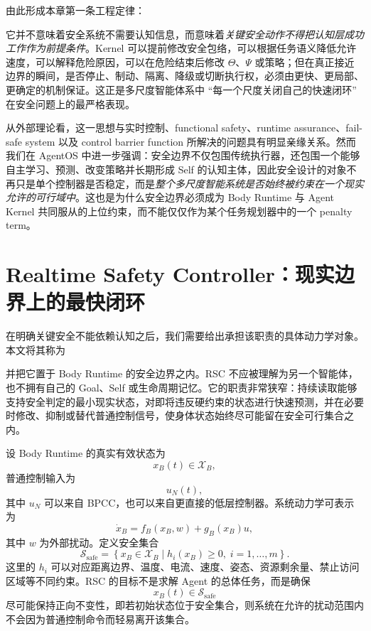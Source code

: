 由此形成本章第一条工程定律：
\begin{statementbox}
\centering
{}
\end{statementbox}
它并不意味着安全系统不需要认知信息，而意味着\emph{关键安全动作不得把认知层成功工作作为前提条件}。Kernel 可以提前修改安全包络，可以根据任务语义降低允许速度，可以解释危险原因，可以在危险结束后修改 $\Theta$、$\Psi$ 或策略；但在真正接近边界的瞬间，是否停止、制动、隔离、降级或切断执行权，必须由更快、更局部、更确定的机制保证。这正是多尺度智能体系中 ``每一个尺度关闭自己的快速闭环'' 在安全问题上的最严格表现。

从外部理论看，这一思想与实时控制、functional safety、runtime assurance、fail-safe system 以及 control barrier function 所解决的问题具有明显亲缘关系。然而我们在 AgentOS 中进一步强调：安全边界不仅包围传统执行器，还包围一个能够自主学习、预测、改变策略并长期形成 Self 的认知主体，因此安全设计的对象不再只是单个控制器是否稳定，而是\emph{整个多尺度智能系统是否始终被约束在一个现实允许的可行域中}。这也是为什么安全边界必须成为 Body Runtime 与 Agent Kernel 共同服从的上位约束，而不能仅仅作为某个任务规划器中的一个 penalty term。

\section{Realtime Safety Controller：现实边界上的最快闭环}

在明确关键安全不能依赖认知之后，我们需要给出承担该职责的具体动力学对象。本文将其称为
\begin{statementbox}
\centering
{}
\end{statementbox}
并把它置于 Body Runtime 的安全边界之内。RSC 不应被理解为另一个智能体，也不拥有自己的 Goal、Self 或生命周期记忆。它的职责非常狭窄：持续读取能够支持安全判定的最小现实状态，对即将违反硬约束的状态进行快速预测，并在必要时修改、抑制或替代普通控制信号，使身体状态始终尽可能留在安全可行集合之内。

设 Body Runtime 的真实有效状态为
\[
x_B(t)\in\mathcal X_B,
\]
普通控制输入为
\[
u_N(t),
\]
其中 $u_N$ 可以来自 BPCC，也可以来自更直接的低层控制器。系统动力学可表示为
\[
\dot x_B
=
f_B(x_B,w)
+
g_B(x_B)u,
\]
其中 $w$ 为外部扰动。定义安全集合
\[
\mathcal S_{\mathrm{safe}}
=
\left\{
x_B\in\mathcal X_B
\mid
h_i(x_B)\geq 0,\;
i=1,\ldots,m
\right\}.
\]
这里的 $h_i$ 可以对应距离边界、温度、电流、速度、姿态、资源剩余量、禁止访问区域等不同约束。RSC 的目标不是求解 Agent 的总体任务，而是确保
\[
x_B(t)\in\mathcal S_{\mathrm{safe}}
\]
尽可能保持正向不变性，即若初始状态位于安全集合，则系统在允许的扰动范围内不会因为普通控制命令而轻易离开该集合。

